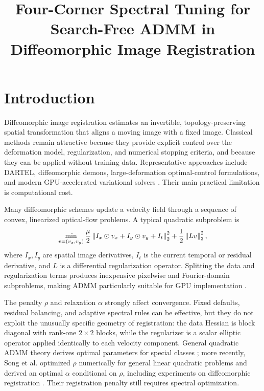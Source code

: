 \documentclass[pdflatex,iicol,sn-mathphys-num]{sn-jnl}
\title[Four-Corner Spectral Tuning]{Four-Corner Spectral Tuning for Search-Free ADMM in Diffeomorphic Image Registration}
\author*[1]{\fnm{Xiaohui} \sur{Xie}}\email{xhx@uci.edu}
\affil*[1]{\orgdiv{Department of Computer Science}, \orgname{University of California, Irvine}, \orgaddress{\city{Irvine}, \state{California}, \country{USA}}}
\theoremstyle{definition}\newtheorem{definition}[theorem]{Definition}\newtheorem{remark}[theorem]{Remark}
\begin{document}
\maketitle


\section{Introduction}
Diffeomorphic image registration estimates an invertible, topology-preserving spatial transformation that aligns a moving image with a fixed image. Classical methods remain attractive because they provide explicit control over the deformation model, regularization, and numerical stopping criteria, and because they can be applied without training data. Representative approaches include DARTEL, diffeomorphic demons, large-deformation optimal-control formulations, and modern GPU-accelerated variational solvers \cite{Ashburner2007,Vercauteren2009,MangBiros2015,Thorley2021}. Their main practical limitation is computational cost.

Many diffeomorphic schemes update a velocity field through a sequence of convex, linearized optical-flow problems. A typical quadratic subproblem is
\begin{equation}
\min_{v=(v_x,v_y)}
\frac{\mu}{2}\left\lVert I_x\odot v_x+I_y\odot v_y+I_t\right\rVert_2^2
+\frac{1}{2}\left\lVert Lv\right\rVert_2^2,
\label{eq:registration}
\end{equation}
where $I_x,I_y$ are spatial image derivatives, $I_t$ is the current temporal or residual derivative, and $L$ is a differential regularization operator. Splitting the data and regularization terms produces inexpensive pixelwise and Fourier-domain subproblems, making ADMM particularly suitable for GPU implementation \cite{Thorley2021,Song2024}.

The penalty $\rho$ and relaxation $\alpha$ strongly affect convergence. Fixed defaults, residual balancing, and adaptive spectral rules can be effective, but they do not exploit the unusually specific geometry of registration: the data Hessian is block diagonal with rank-one $2\times2$ blocks, while the regularizer is a scalar elliptic operator applied identically to each velocity component. General quadratic ADMM theory derives optimal parameters for special classes \cite{Ghadimi2015,Teixeira2016,GiselssonBoyd2017}; more recently, Song et al. optimized $\rho$ numerically for general linear quadratic problems and derived an optimal $\alpha$ conditional on $\rho$, including experiments on diffeomorphic registration \cite{Song2024}. Their registration penalty still requires spectral optimization.
\end{document}
